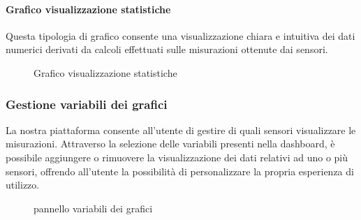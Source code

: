 \paragraph{Grafico visualizzazione statistiche}
\hypertarget{par:visu_stat}{}
Questa tipologia di grafico consente una visualizzazione chiara e intuitiva dei dati numerici derivati da calcoli effettuati sulle misurazioni ottenute dai sensori.
\begin{figure}[H]
    \centering
    \caption{Grafico visualizzazione statistiche}
    \label{fig:my_label}
\end{figure}


\subsubsection{Gestione variabili dei grafici}
La nostra piattaforma consente all'utente di gestire di quali sensori visualizzare le misurazioni. Attraverso la selezione delle variabili presenti nella dashboard, è possibile aggiungere o rimuovere la visualizzazione dei dati relativi ad uno o più sensori, offrendo all'utente la possibilità di personalizzare la propria esperienza di utilizzo.
\begin{figure}[H]
    \centering
    \caption{pannello variabili dei grafici}
    \label{fig:my_label}
\end{figure}


